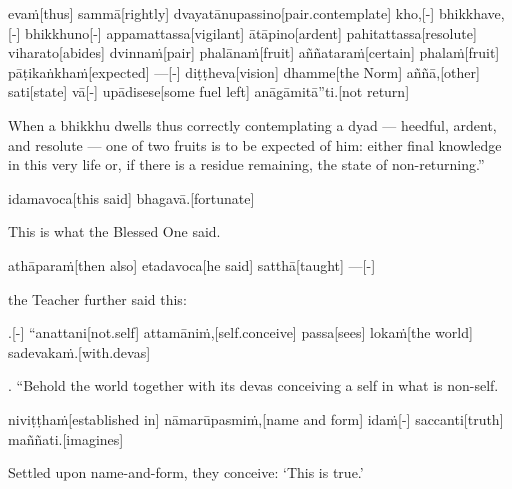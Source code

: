 \begin{samepage}
\begingl[glneveryline={\PaliGlossA,\PaliGlossB}]
evaṁ[thus] sammā[rightly] dvayatānupassino[pair.contemplate] kho,[-] bhikkhave,[-] bhikkhuno[-] appamattassa[vigilant] ātāpino[ardent] pahitattassa[resolute] viharato[abides] dvinnaṁ[pair] phalānaṁ[fruit] aññataraṁ[certain] phalaṁ[fruit] pāṭikaṅkhaṁ[expected] —[-] diṭṭheva[vision] dhamme[the Norm] aññā,[other] sati[state] vā[-] upādisese[some fuel left] anāgāmitā”ti.[not return]
\endgl
\nopagebreak
\linespread{0.5}
\begin{spacin}{0.2}
{\PaliGlossFT When a bhikkhu dwells thus correctly contemplating a dyad — heedful, ardent, and resolute — one of two fruits is to be expected of him: either final knowledge in this very life or, if there is a residue remaining, the state of non-returning.”}
\end{spacin}
\vskip 12pt
\end{samepage}
\begin{samepage}
\begingl[glneveryline={\PaliGlossA,\PaliGlossB}]
idamavoca[this said] bhagavā.[fortunate]
\endgl
\nopagebreak
\linespread{0.5}
\begin{spacin}{0.2}
{\PaliGlossFT This is what the Blessed One said.}
\end{spacin}
\vskip 12pt
\end{samepage}
\begin{samepage}
\begingl[glneveryline={\PaliGlossA,\PaliGlossB}]
athāparaṁ[then also] etadavoca[he said] satthā[taught] —[-]
\endgl
\nopagebreak
\linespread{0.5}
\begin{spacin}{0.2}
{\PaliGlossFT the Teacher further said this:}
\end{spacin}
\vskip 12pt
\end{samepage}
\vskip 0.2in
\begin{samepage}
.[-] “anattani[not.self] attamāniṁ,[self.conceive] passa[sees] lokaṁ[the world] sadevakaṁ.[with.devas]
\endgl
\nopagebreak
\linespread{0.5}
\begin{spacin}{0.2}
{. “Behold the world together with its devas conceiving a self in what is non-self.}
\end{spacin}
\vskip 12pt
\end{samepage}
\begin{samepage}
\begingl[glneveryline={\PaliGlossA,\PaliGlossB}]
niviṭṭhaṁ[established in] nāmarūpasmiṁ,[name and form] idaṁ[-] saccanti[truth] maññati.[imagines]
\endgl
\nopagebreak
\linespread{0.5}
\begin{spacin}{0.2}
{\PaliGlossFT Settled upon name-and-form, they conceive: ‘This is true.’}
\end{spacin}
\vskip 12pt
\end{samepage}
